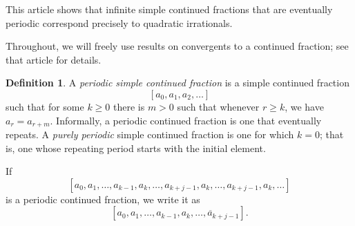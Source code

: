 \documentclass[12pt]{article}
\theoremstyle{definition}
\newtheorem{defn}{Definition}
\begin{document}
This article shows that infinite simple continued fractions that are eventually periodic correspond precisely to quadratic irrationals.

Throughout, we will freely use results on convergents to a continued fraction; see that article for details.

\begin{defn} A \emph{periodic simple continued fraction} is a simple continued fraction 
\[[a_0,a_1,a_2,\ldots]\]
such that for some $k\geq 0$ there is $m>0$ such that whenever $r \geq k$, we have $a_r = a_{r+m}$. Informally, a periodic continued fraction is one that eventually repeats. A \emph{purely periodic} simple continued fraction is one for which $k=0$; that is, one whose repeating period starts with the initial element.
\end{defn}

If
\[[a_0,a_1,\ldots,a_{k-1},a_k,\ldots,a_{k+j-1},a_k,\ldots,a_{k+j-1},a_k,\ldots]\]
is a periodic continued fraction, we write it as \[[a_0,a_1,\ldots,a_{k-1},\overline{a_k,\ldots,a_{k+j-1}}].\]
\end{document}
